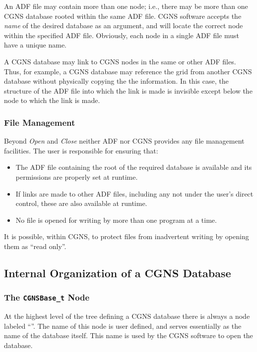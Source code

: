 An ADF file may contain more than one  node; i.e.,
there may be more than one CGNS database rooted within the same ADF
file.
CGNS software accepts the \emph{name} of the desired database as an
argument, and will locate the correct  node within the
specified ADF file.
Obviously, each  node in a single ADF file must have a
unique name.

A CGNS database may link to CGNS nodes in the same or other ADF
files. Thus, for example, a CGNS database may reference the grid from
another CGNS database without physically copying the the information.
In this case, the structure of the ADF file into which the link is made
is invisible except below the node to which the link is made.

\subsubsection{File Management}

Beyond \textit{Open} and \textit{Close} neither ADF nor CGNS provides
any file management facilities. The user is responsible for ensuring
that:

\begin{itemize}
\item The ADF file containing the root of the required database is
      available and its permissions are properly set at runtime.
\item If links are made to other ADF files, including any not under the
      user's direct control, these are also available at runtime.
\item No file is opened for writing by more than one program at a time.
\end{itemize}

It is possible, within CGNS, to protect files from inadvertent writing
by opening them as ``read only''.

\subsection{Internal Organization of a CGNS Database}
\label{s:internal}

\subsubsection{The \texttt{CGNSBase\_t} Node}

At the highest level of the tree defining a CGNS database there is
always a node labeled ``''. The name of this
node is user defined, and serves essentially as the name of the
database itself. This name is used by the CGNS software to open the
database.

